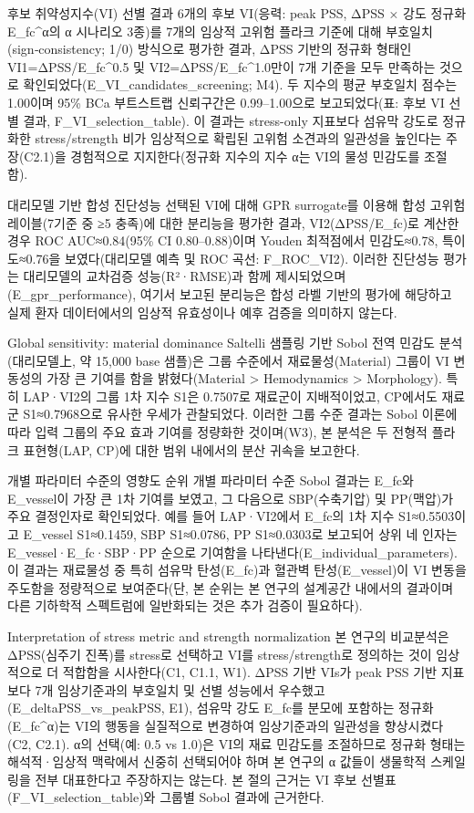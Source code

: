 \documentclass[preprint,12pt]{elsarticle}
\begin{document}
후보 취약성지수(VI) 선별 결과
6개의 후보 VI(응력: peak PSS, ΔPSS × 강도 정규화 E\_fc\textasciicircum α의 α 시나리오 3종)를 7개의 임상적 고위험 플라크 기준에 대해 부호일치(sign‑consistency; 1/0) 방식으로 평가한 결과, ΔPSS 기반의 정규화 형태인 VI1=ΔPSS/E\_fc\textasciicircum {0.5} 및 VI2=ΔPSS/E\_fc\textasciicircum {1.0}만이 7개 기준을 모두 만족하는 것으로 확인되었다(E\_VI\_candidates\_screening; M4). 두 지수의 평균 부호일치 점수는 1.00이며 95\% BCa 부트스트랩 신뢰구간은 0.99–1.00으로 보고되었다(표: 후보 VI 선별 결과, F\_VI\_selection\_table). 이 결과는 stress-only 지표보다 섬유막 강도로 정규화한 stress/strength 비가 임상적으로 확립된 고위험 소견과의 일관성을 높인다는 주장(C2.1)을 경험적으로 지지한다(정규화 지수의 지수 α는 VI의 물성 민감도를 조절함).

대리모델 기반 합성 진단성능
선택된 VI에 대해 GPR surrogate를 이용해 합성 고위험 레이블(7기준 중 ≥5 충족)에 대한 분리능을 평가한 결과, VI2(ΔPSS/E\_fc)로 계산한 경우 ROC AUC≈0.84(95\% CI 0.80–0.88)이며 Youden 최적점에서 민감도≈0.78, 특이도≈0.76을 보였다(대리모델 예측 및 ROC 곡선: F\_ROC\_VI2). 이러한 진단성능 평가는 대리모델의 교차검증 성능(R²·RMSE)과 함께 제시되었으며(E\_gpr\_performance), 여기서 보고된 분리능은 합성 라벨 기반의 평가에 해당하고 실제 환자 데이터에서의 임상적 유효성이나 예후 검증을 의미하지 않는다.

Global sensitivity: material dominance
Saltelli 샘플링 기반 Sobol 전역 민감도 분석(대리모델上, 약 15,000 base 샘플)은 그룹 수준에서 재료물성(Material) 그룹이 VI 변동성의 가장 큰 기여를 함을 밝혔다(Material > Hemodynamics > Morphology). 특히 LAP·VI2의 그룹 1차 지수 S1은 0.7507로 재료군이 지배적이었고, CP에서도 재료군 S1≈0.7968으로 유사한 우세가 관찰되었다. 이러한 그룹 수준 결과는 Sobol 이론에 따라 입력 그룹의 주요 효과 기여를 정량화한 것이며(W3), 본 분석은 두 전형적 플라크 표현형(LAP, CP)에 대한 범위 내에서의 분산 귀속을 보고한다.

개별 파라미터 수준의 영향도 순위
개별 파라미터 수준 Sobol 결과는 E\_fc와 E\_vessel이 가장 큰 1차 기여를 보였고, 그 다음으로 SBP(수축기압) 및 PP(맥압)가 주요 결정인자로 확인되었다. 예를 들어 LAP·VI2에서 E\_fc의 1차 지수 S1≈0.5503이고 E\_vessel S1≈0.1459, SBP S1≈0.0786, PP S1≈0.0303로 보고되어 상위 네 인자는 E\_vessel·E\_fc·SBP·PP 순으로 기여함을 나타낸다(E\_individual\_parameters). 이 결과는 재료물성 중 특히 섬유막 탄성(E\_fc)과 혈관벽 탄성(E\_vessel)이 VI 변동을 주도함을 정량적으로 보여준다(단, 본 순위는 본 연구의 설계공간 내에서의 결과이며 다른 기하학적 스펙트럼에 일반화되는 것은 추가 검증이 필요하다).

Interpretation of stress metric and strength normalization
본 연구의 비교분석은 ΔPSS(심주기 진폭)를 stress로 선택하고 VI를 stress/strength로 정의하는 것이 임상적으로 더 적합함을 시사한다(C1, C1.1, W1). ΔPSS 기반 VIs가 peak PSS 기반 지표보다 7개 임상기준과의 부호일치 및 선별 성능에서 우수했고(E\_deltaPSS\_vs\_peakPSS, E1), 섬유막 강도 E\_fc를 분모에 포함하는 정규화(E\_fc\textasciicircum α)는 VI의 행동을 실질적으로 변경하여 임상기준과의 일관성을 향상시켰다(C2, C2.1). α의 선택(예: 0.5 vs 1.0)은 VI의 재료 민감도를 조절하므로 정규화 형태는 해석적·임상적 맥락에서 신중히 선택되어야 하며 본 연구의 α 값들이 생물학적 스케일링을 전부 대표한다고 주장하지는 않는다. 본 절의 근거는 VI 후보 선별표(F\_VI\_selection\_table)와 그룹별 Sobol 결과에 근거한다.
\end{document}

